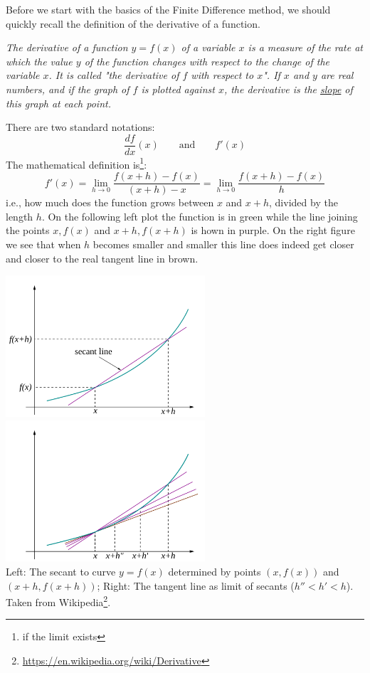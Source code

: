 Before we start with the basics of the Finite Difference method, we should quickly recall the definition 
of the derivative of a function. 

\begin{center}
{\sl 
The derivative of a function $y=f(x)$ of a variable $x$ is a measure of the rate at which the value $y$ 
of the function changes with respect to the change of the variable $x$. It is called "the derivative of $f$ 
with respect to $x$". If $x$ and $y$ are real numbers, and if the graph of $f$ is plotted against $x$, the derivative 
is the \underline{slope} of this graph at each point. 
}
\end{center}

\noindent There are two standard notations:
\[
\frac{df}{dx}(x) \qquad \text{and} \qquad f'(x)
\]
The mathematical definition is\footnote{if the limit exists}:
\[
\boxed{
f'(x)
=\lim_{h\rightarrow 0} \frac{f(x+h)-f(x)}{(x+h)-x} 
=\lim_{h\rightarrow 0} \frac{f(x+h)-f(x)}{h} 
}
\]
i.e., how much does the function grows between $x$ and $x+h$, divided by the length $h$.
On the following left plot the function is in green while the line joining the points
$x,f(x)$ and $x+h,f(x+h)$ is hown in purple. On the right figure we see that 
when $h$ becomes smaller and smaller this line does indeed get closer and closer 
to the real tangent line in brown.

\begin{center}
\includegraphics[width=7.4cm]{images/derivative/der2}
\includegraphics[width=7.4cm]{images/derivative/der1}\\
{\captionfont 
Left: The secant to curve $y=f(x)$ determined by points $(x,f(x))$ and $(x+h, f(x+h))$;
Right: The tangent line as limit of secants ($h''<h'<h$).
Taken from Wikipedia\footnote{\url{https://en.wikipedia.org/wiki/Derivative}}.
}
\end{center}

